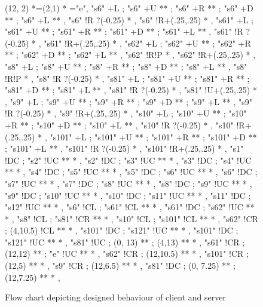 \begin{figure}[H]
\begin{center}
(12, 2)  	*=(2,1) 					*\frm<44pt>{-} ="e",
%
"s6"  +L ; "s6" +U **\dir{-} 
; "s6" +R **\dir{-} 
; "s6" +D **\dir{-} 
; "s6" +L **\dir{-} ,
"s6" !R ?(-0.25) * ,
"s6" !R+(.25,.25) * ,
%
"s61"  +L ; "s61" +U **\dir{-} 
; "s61" +R **\dir{-} 
; "s61" +D **\dir{-} 
; "s61" +L **\dir{-} ,
"s61" !R ?(-0.25) * ,
"s61" !R+(.25,.25) * ,
%
"s62"  +L ; "s62" +U **\dir{-} 
; "s62" +R **\dir{-} 
; "s62" +D **\dir{-} 
; "s62" +L **\dir{-} ,
"s62" !R!P * ,
"s62" !R+(.25,.25) * ,
%
"s8"  +L ; "s8" +U **\dir{-} 
; "s8" +R **\dir{-} 
; "s8" +D **\dir{-} 
; "s8" +L **\dir{-} ,
"s8" !R!P * ,
"s8" !R ?(-0.25) * ,
%
"s81"  +L ; "s81" +U **\dir{-} 
; "s81" +R **\dir{-} 
; "s81" +D **\dir{-} 
; "s81" +L **\dir{-} ,
"s81" !R ?(-0.25) * ,
"s81" !U+(.25,.25) * ,
%
"s9"  +L ; "s9" +U **\dir{-} 
; "s9" +R **\dir{-} 
; "s9" +D **\dir{-} 
; "s9" +L **\dir{-} ,
"s9" !R ?(-0.25) * ,
"s9" !R+(.25,.25) * ,
%
"s10"  +L ; "s10" +U **\dir{-} 
; "s10" +R **\dir{-} 
; "s10" +D **\dir{-} 
; "s10" +L **\dir{-} ,
"s10" !R ?(-0.25) * ,
"s10" !R+(.25,.25) * ,
%
"s101"  +L ; "s101" +U **\dir{-} 
; "s101" +R **\dir{-} 
; "s101" +D **\dir{-} 
; "s101" +L **\dir{-} ,
"s101" !R ?(-0.25) * ,
"s101" !R+(.25,.25) * ,
%
"s1" !DC ; "s2" !UC **\dir{-} *\dir{>} ,
"s2" !DC ; "s3" !UC **\dir{-} *\dir{>} ,
"s3" !DC ; "s4" !UC **\dir{-} *\dir{>} ,
"s4" !DC ; "s5" !UC **\dir{-} *\dir{>} ,
"s5" !DC ; "s6" !UC **\dir{-} *\dir{>} ,
"s6" !DC ; "s7" !UC **\dir{-} *\dir{>} ,
"s7"  !DC ; "s8"  !UC **\dir{-} *\dir{>} ,
"s8"  !DC ; "s9"  !UC **\dir{-} *\dir{>} ,
"s9"  !DC ; "s10" !UC **\dir{-} *\dir{>} ,
"s10" !DC ; "s11" !UC **\dir{-} *\dir{>} ,
"s11" !DC ; "s12" !UC **\dir{-} *\dir{>} ,
%
"s6"  !CL ; "s61" !CL **\dir{-} *\dir{>} ,
"s61" !DC ; "s62" !UC **\dir{-} *\dir{>} ,
%
"s8"  !CL ; "s81" !CR **\dir{-} *\dir{>} ,
%
"s10"  !CL ; "s101" !CL **\dir{-} *\dir{>} ,
%
"s62"  !CR ; (4,10.5) !CL **\dir{-} *\dir{>} ,
%
"s101"  !DC ; "s121" !UC **\dir{-} *\dir{>} ,
%
"s101"  !DC ; "s121" !UC **\dir{-} *\dir{>} ,
%
"s81"  !UC ; (0, 13) **\dir{-} ; (4,13) **\dir{-} *\dir{>} ,
%
"s61"  !CR ; (12,12) **\dir{-} ; "e" !UC **\dir{-} *\dir{>} ,
"s62"  !CR ; (12,10.5) **\dir{-} *\dir{>} ,
%
"s101"  !CR ; (12,5) **\dir{-} *\dir{>} ,
%
"s9"  !CR ; (12,6.5) **\dir{-} *\dir{>} ,
%
"s81"  !DC ; (0, 7.25) **\dir{-} ; (12,7.25) **\dir{-} *\dir{>} ,
\endxy

\end{center}

\caption{Flow chart depicting designed behaviour of client and server}

\end{figure}
